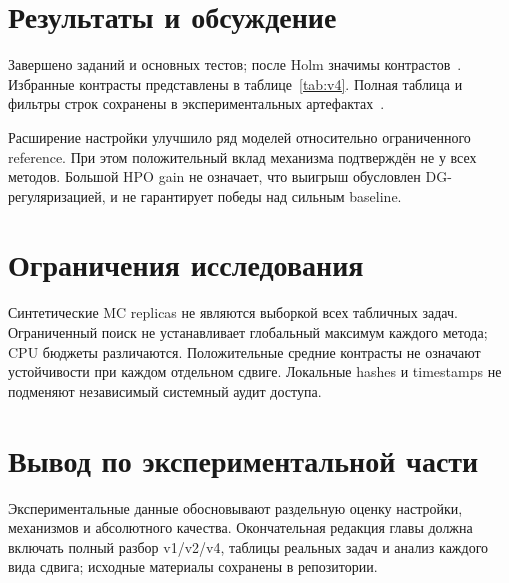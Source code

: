 \section{Результаты и обсуждение}
Завершено \FinalJobs{} заданий и \PrimaryTests{} основных тестов; после Holm значимы \SignificantTests{} контрастов~\cite{v4audit}. Избранные контрасты представлены в таблице~\ref{tab:v4}. Полная таблица и фильтры строк сохранены в экспериментальных артефактах~\cite{v4tests}.



Расширение настройки улучшило ряд моделей относительно ограниченного reference. При этом положительный вклад механизма подтверждён не у всех методов. Большой HPO gain не означает, что выигрыш обусловлен DG-регуляризацией, и не гарантирует победы над сильным baseline.

\section{Ограничения исследования}
Синтетические MC replicas не являются выборкой всех табличных задач. Ограниченный поиск не устанавливает глобальный максимум каждого метода; CPU бюджеты различаются. Положительные средние контрасты не означают устойчивости при каждом отдельном сдвиге. Локальные hashes и timestamps не подменяют независимый системный аудит доступа.

\section{Вывод по экспериментальной части}
Экспериментальные данные обосновывают раздельную оценку настройки, механизмов и абсолютного качества. Окончательная редакция главы должна включать полный разбор v1/v2/v4, таблицы реальных задач и анализ каждого вида сдвига; исходные материалы сохранены в репозитории.
